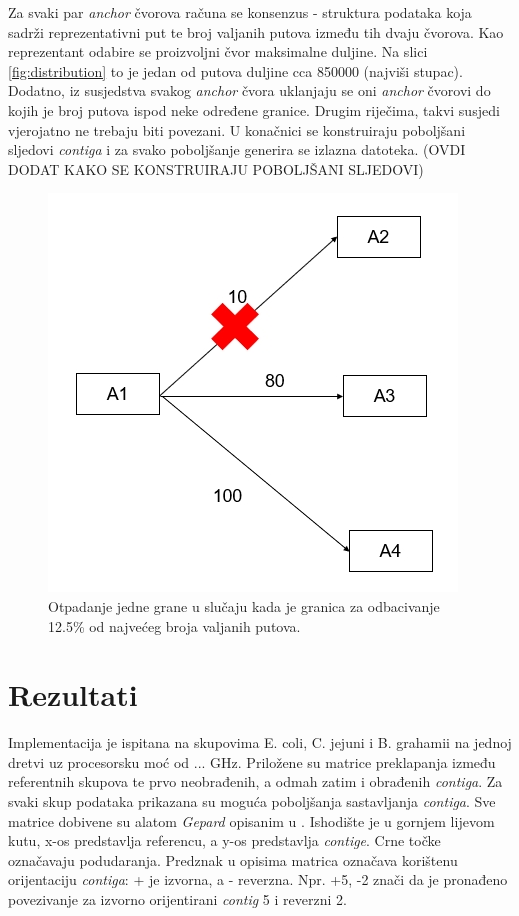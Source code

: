 \documentclass[times, utf8, seminar, numeric]{fer}
\begin{document}
Za svaki par \textit{anchor} čvorova računa se konsenzus - struktura podataka koja sadrži reprezentativni put te broj valjanih putova između tih dvaju čvorova. Kao reprezentant odabire se proizvoljni čvor maksimalne duljine. Na slici \ref{fig:distribution} to je jedan od putova duljine cca 850000 (najviši stupac). Dodatno, iz susjedstva svakog \textit{anchor} čvora uklanjaju se oni \textit{anchor} čvorovi do kojih je broj putova ispod neke određene granice. Drugim riječima, takvi susjedi vjerojatno ne trebaju biti povezani. U konačnici se konstruiraju poboljšani sljedovi \textit{contiga} i za svako poboljšanje generira se izlazna datoteka. (OVDI DODAT KAKO SE KONSTRUIRAJU POBOLJŠANI SLJEDOVI)%

\begin{figure}[h]
	\centering
	\centerline{\includegraphics[width=0.6\linewidth]{img/valid_path_numbers_filtered}}
	\caption{Otpadanje jedne grane u slučaju kada je granica za odbacivanje 12.5\% od najvećeg broja valjanih putova.}
	\label{fig:validpathnumbersfiltered}
\end{figure}

\chapter{Rezultati}
Implementacija je ispitana na skupovima E. coli, C. jejuni i B. grahamii na jednoj dretvi uz procesorsku moć od ... GHz. Priložene su matrice preklapanja između referentnih skupova te prvo neobrađenih, a odmah zatim i obrađenih \textit{contiga}. Za svaki skup podataka prikazana su moguća poboljšanja sastavljanja \textit{contiga}. Sve matrice dobivene su alatom \textit{Gepard} opisanim u \cite{gepard}. Ishodište je u gornjem lijevom kutu, x-os predstavlja referencu, a y-os predstavlja \textit{contige}. Crne točke označavaju podudaranja. Predznak u opisima matrica označava korištenu orijentaciju \textit{contiga}: + je izvorna, a - reverzna. Npr. +5, -2 znači da je pronađeno povezivanje za izvorno orijentirani \textit{contig} 5 i reverzni 2.
\end{document}
